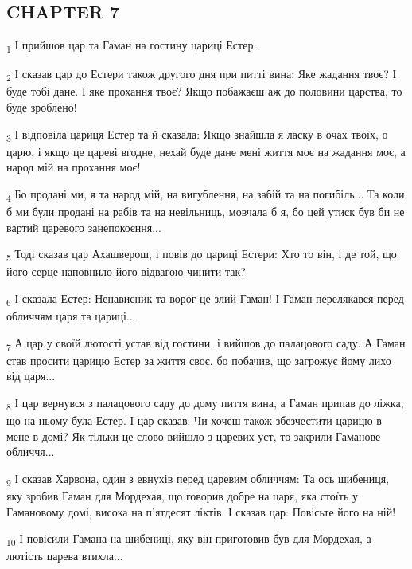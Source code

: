 \subsection{CHAPTER 7}
\begin{tcolorbox}
\textsubscript{1} І прийшов цар та Гаман на гостину цариці Естер.
\end{tcolorbox}
\begin{tcolorbox}
\textsubscript{2} І сказав цар до Естери також другого дня при питті вина: Яке жадання твоє? І буде тобі дане. І яке прохання твоє? Якщо побажаєш аж до половини царства, то буде зроблено!
\end{tcolorbox}
\begin{tcolorbox}
\textsubscript{3} І відповіла цариця Естер та й сказала: Якщо знайшла я ласку в очах твоїх, о царю, і якщо це цареві вгодне, нехай буде дане мені життя моє на жадання моє, а народ мій на прохання моє!
\end{tcolorbox}
\begin{tcolorbox}
\textsubscript{4} Бо продані ми, я та народ мій, на вигублення, на забій та на погибіль... Та коли б ми були продані на рабів та на невільниць, мовчала б я, бо цей утиск був би не вартий царевого занепокоєння...
\end{tcolorbox}
\begin{tcolorbox}
\textsubscript{5} Тоді сказав цар Ахашверош, і повів до цариці Естери: Хто то він, і де той, що його серце наповнило його відвагою чинити так?
\end{tcolorbox}
\begin{tcolorbox}
\textsubscript{6} І сказала Естер: Ненависник та ворог це злий Гаман! І Гаман перелякався перед обличчям царя та цариці...
\end{tcolorbox}
\begin{tcolorbox}
\textsubscript{7} А цар у своїй лютості устав від гостини, і вийшов до палацового саду. А Гаман став просити царицю Естер за життя своє, бо побачив, що загрожує йому лихо від царя...
\end{tcolorbox}
\begin{tcolorbox}
\textsubscript{8} І цар вернувся з палацового саду до дому пиття вина, а Гаман припав до ліжка, що на ньому була Естер. І цар сказав: Чи хочеш також збезчестити царицю в мене в домі? Як тільки це слово вийшло з царевих уст, то закрили Гаманове обличчя...
\end{tcolorbox}
\begin{tcolorbox}
\textsubscript{9} І сказав Харвона, один з евнухів перед царевим обличчям: Та ось шибениця, яку зробив Гаман для Мордехая, що говорив добре на царя, яка стоїть у Гамановому домі, висока на п'ятдесят ліктів. І сказав цар: Повісьте його на ній!
\end{tcolorbox}
\begin{tcolorbox}
\textsubscript{10} І повісили Гамана на шибениці, яку він приготовив був для Мордехая, а лютість царева втихла...
\end{tcolorbox}
